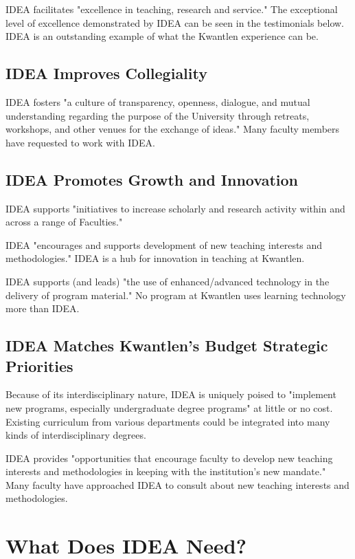 \documentclass[letterpaper,10pt,headsepline]{scrreprt}
\begin{document}
IDEA facilitates "excellence in teaching, research and service." The exceptional level of excellence demonstrated by IDEA can be seen in the testimonials below. IDEA is an outstanding example of what the Kwantlen experience can be.

\subsection{IDEA Improves Collegiality}

IDEA fosters "a culture of transparency, openness, dialogue, and mutual understanding regarding the purpose of the University through retreats, workshops, and other venues for the exchange of ideas." Many faculty members have requested to work with IDEA.

\subsection{IDEA Promotes Growth and Innovation}

IDEA supports "initiatives to increase scholarly and research activity within and across a range of Faculties."

IDEA "encourages and supports development of new teaching interests and methodologies." IDEA is a hub for innovation in teaching at Kwantlen.

IDEA supports (and leads) "the use of enhanced/advanced technology in the delivery of program material." No program at Kwantlen uses learning technology more than IDEA.

\subsection{IDEA Matches Kwantlen's Budget Strategic Priorities}

Because of its interdisciplinary nature, IDEA is uniquely poised to "implement new programs, especially undergraduate degree programs" at little or no cost. Existing curriculum from various departments could be integrated into many kinds of interdisciplinary degrees.

IDEA provides "opportunities that encourage faculty to develop new teaching interests and methodologies in keeping with the institution’s new mandate." Many faculty have approached IDEA to consult about new teaching interests and methodologies.


\section{What Does IDEA Need?}
\end{document}
